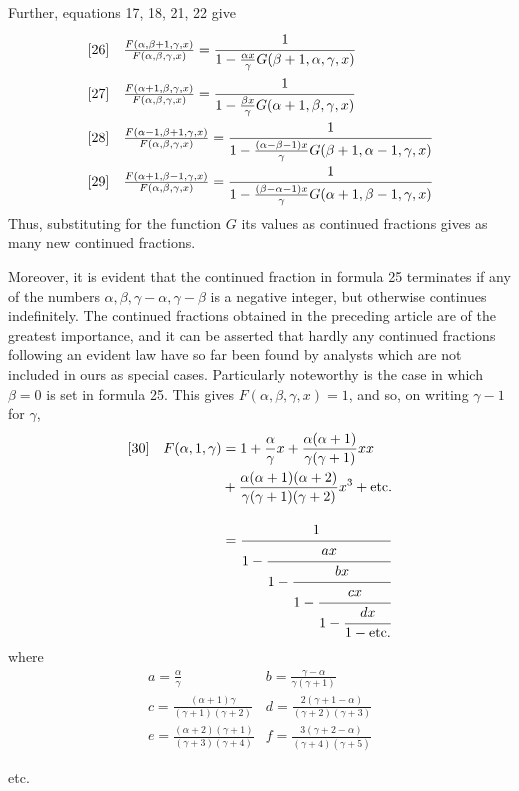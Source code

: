 Further, equations 17, 18, 21, 22 give
\[
\begin{array}{rl}
[26]&\frac{F(\alpha,\beta+1,\gamma,x)}{F(\alpha,\beta,\gamma,x)}=\cfrac{1}{1-\frac{\alpha x}{\gamma}G(\beta+1,\alpha,\gamma,x)}\\[12pt]
[27]&\frac{F(\alpha+1,\beta,\gamma,x)}{F(\alpha,\beta,\gamma,x)}=\cfrac{1}{1-\frac{\beta x}{\gamma}G(\alpha+1,\beta,\gamma,x)}\\[12pt]
[28]&\frac{F(\alpha-1,\beta+1,\gamma,x)}{F(\alpha,\beta,\gamma,x)}=\cfrac{1}{1-\frac{(\alpha-\beta-1)x}{\gamma}G(\beta+1,\alpha-1,\gamma,x)}\\[12pt]
[29]&\frac{F(\alpha+1,\beta-1,\gamma,x)}{F(\alpha,\beta,\gamma,x)}=\cfrac{1}{1-\frac{(\beta-\alpha-1)x}{\gamma}G(\alpha+1,\beta-1,\gamma,x)}
\end{array}
\]
Thus, substituting for the function $G$ its values as continued fractions gives as many new continued fractions.

Moreover, it is evident that the continued fraction in formula 25 terminates if any of the numbers $\alpha,\beta,\gamma-\alpha,\gamma-\beta$ is a negative integer, but otherwise continues indefinitely.
The continued fractions obtained in the preceding article are of the greatest importance, and it can be asserted that hardly any continued fractions following an evident law have so far been found by analysts which are not included in ours as special cases. Particularly noteworthy is the case in which $\beta=0$ is set in formula 25. This gives $F(\alpha,\beta,\gamma,x)=1$, and so, on writing $\gamma-1$ for $\gamma$,
\[
\begin{aligned}
{}[30]\quad F(\alpha,1,\gamma)&=1+\frac{\alpha}{\gamma}x+\frac{\alpha(\alpha+1)}{\gamma(\gamma+1)}xx\\&{}+\frac{\alpha(\alpha+1)(\alpha+2)}{\gamma(\gamma+1)(\gamma+2)}x^3+\hbox{etc.}\\[9pt]
&=\cfrac{1}{1-\cfrac{ax}{1-\cfrac{bx}{1-\cfrac{cx}{1-\cfrac{dx}{1-\hbox{etc.}}}}}}
\end{aligned}
\]
where
\[
\begin{array}{ll}
a=\frac{\alpha}{\gamma}&b=\frac{\gamma-\alpha}{\gamma(\gamma+1)}\\[6pt]
c=\frac{(\alpha+1)\gamma}{(\gamma+1)(\gamma+2)}&d=\frac{2(\gamma+1-\alpha)}{(\gamma+2)(\gamma+3)}\\[6pt]
e=\frac{(\alpha+2)(\gamma+1)}{(\gamma+3)(\gamma+4)}&f=\frac{3(\gamma+2-\alpha)}{(\gamma+4)(\gamma+5)}
\end{array}
\]
\begin{center}etc.\end{center}
